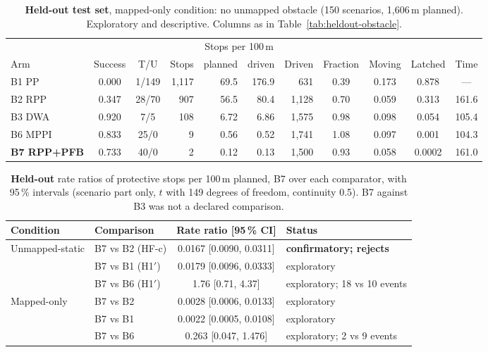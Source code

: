 \documentclass[11pt]{article}
\newcommand{\Hprime}{H1$'$}
\theoremstyle{definition}
\begin{document}
\begin{table}[!htbp]
\centering
\caption{\textbf{Held-out test set}, mapped-only condition: no unmapped obstacle (150 scenarios, 1{,}606\,m
planned). Exploratory and descriptive. Columns as in Table~\ref{tab:heldout-obstacle}.}
\label{tab:heldout-clear}
\footnotesize
\setlength{\tabcolsep}{3.2pt}
\begin{tabular}{lccrrrrcccc}
\toprule
& & & & \multicolumn{2}{c}{Stops per 100\,m} & & & & &\\
\cmidrule(lr){5-6}
Arm & Success & T/U & Stops & planned & driven & Driven & Fraction & Moving & Latched & Time\\
\midrule
B1 PP & 0.000 & 1/149 & 1{,}117 & 69.5 & 176.9 & 631 & 0.39 & 0.173 & 0.878 & ---\\
B2 RPP & 0.347 & 28/70 & 907 & 56.5 & 80.4 & 1{,}128 & 0.70 & 0.059 & 0.313 & 161.6\\
B3 DWA & 0.920 & 7/5 & 108 & 6.72 & 6.86 & 1{,}575 & 0.98 & 0.098 & 0.054 & 105.4\\
B6 MPPI & 0.833 & 25/0 & 9 & 0.56 & 0.52 & 1{,}741 & 1.08 & 0.097 & 0.001 & 104.3\\
\textbf{B7 RPP+PFB} & 0.733 & 40/0 & 2 & 0.12 & 0.13 & 1{,}500 & 0.93 & 0.058 & 0.0002 & 161.0\\
\bottomrule
\end{tabular}
\end{table}

\begin{table}[!htbp]
\centering
\caption{\textbf{Held-out} rate ratios of protective stops per 100\,m planned, B7 over each comparator, with
95\,\% intervals (scenario part only, $t$ with 149 degrees of freedom, continuity 0.5). B7 against B3 was not a
declared comparison.}
\label{tab:rr}
\small
\begin{tabular}{llcl}
\toprule
Condition & Comparison & Rate ratio [95\,\% CI] & Status\\
\midrule
Unmapped-static & B7 vs B2 (HF-c) & 0.0167 [0.0090, 0.0311] & \textbf{confirmatory; rejects}\\
& B7 vs B1 (\Hprime) & 0.0179 [0.0096, 0.0333] & exploratory\\
& B7 vs B6 (\Hprime) & 1.76 [0.71, 4.37] & exploratory; 18 vs 10 events\\
\midrule
Mapped-only & B7 vs B2 & 0.0028 [0.0006, 0.0133] & exploratory\\
& B7 vs B1 & 0.0022 [0.0005, 0.0108] & exploratory\\
& B7 vs B6 & 0.263 [0.047, 1.476] & exploratory; 2 vs 9 events\\
\bottomrule
\end{tabular}
\end{table}
\end{document}
